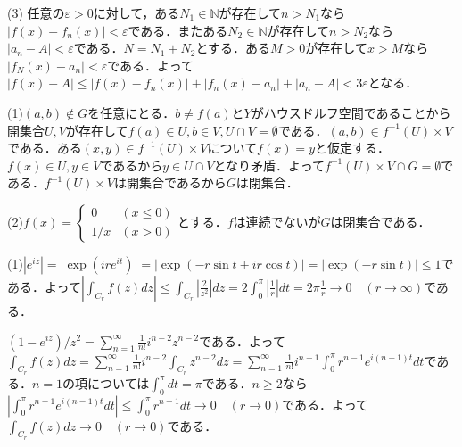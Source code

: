 \documentclass[
		book,
		head_space=20mm,
		foot_space=20mm,
		gutter=10mm,
		line_length=190mm
]{jlreq}
\begin{document}
(3)
任意の$\varepsilon>0$に対して，ある$N_1 \in \mathbb{N}$が存在して$n>N_1$なら$|f(x)-f_n(x)|<\varepsilon$である．またある$N_2 \in \mathbb{N}$が存在して$n>N_2$なら$|a_n-A|<\varepsilon$である．$N=N_1+N_2$とする．ある$M>0$が存在して$x>M$なら$|f_N(x)-a_n|<\varepsilon$である．よって$|f(x)-A|\le|f(x)-f_n(x)|+|f_n(x)-a_n|+|a_n-A|<3\varepsilon$となる．

(1)$(a,b)\notin G$を任意にとる．$b\neq f(a)$と$Y$がハウスドルフ空間であることから開集合$U,V$が存在して$f(a)\in U,b\in V,U\cap V=\emptyset$である．$(a,b)\in f^{-1}(U)\times V$である．ある$(x,y)\in f^{-1}(U)\times V$について$f(x)=y$と仮定する．$f(x)\in U,y\in V$であるから$y \in U\cap V$となり矛盾．よって$f^{-1}(U)\times V \cap G = \emptyset$である．$f^{-1}(U)\times V$は開集合であるから$G$は閉集合．

(2)$f(x)=\begin{cases}
    0 & (x\le 0) \\
    1/x & (x>0)
\end{cases}$とする．$f$は連続でないが$G$は閉集合である．

(1)$|e^{iz}|=|\exp({ire^{it}})|=|\exp(-r\sin t+ir\cos t)|=|\exp(-r\sin t)|\le 1$である．よって$|\int_{C_r} f(z)dz|\le \int_{C_r} |\frac{2}{z^2}|dz=2\int_0^{\pi} |\frac{1}{r}|dt=2\pi\frac{1}{r}\rightarrow 0 \quad(r\rightarrow \infty)$である．

$(1-e^{iz})/z^2=\sum\limits_{n=1}^\infty \frac{1}{n!}i^{n-2}z^{n-2}$である．よって$\int_{C_r} f(z)dz= \sum\limits_{n=1}^\infty \frac{1}{n!}i^{n-2}\int_{C_r}z^{n-2}dz=\sum\limits_{n=1}^\infty \frac{1}{n!}i^{n-1}\int_{0}^\pi r^{n-1}e^{i(n-1)t}dt$である．$n=1$の項については$\int_{0}^\pi dt=\pi$である．$n\ge 2$なら
$|\int_0^\pi r^{n-1}e^{i(n-1)t}dt|\le \int_0^\pi r^{n-1}dt\rightarrow0 \quad(r\to 0)$である．よって$\int_{C_r} f(z)dz\rightarrow 0 \quad(r\to 0)$である．
\end{document}
